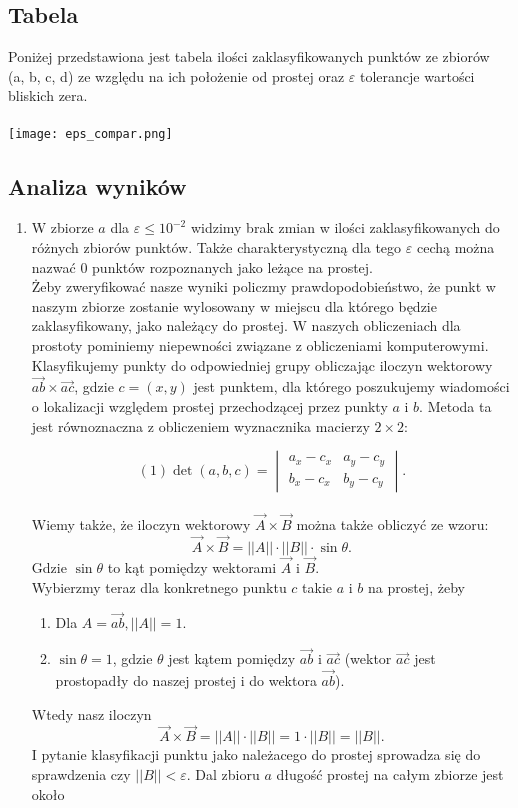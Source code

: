 \subsection{Tabela}
\quad Poniżej przedstawiona jest tabela ilości zaklasyfikowanych punktów
 ze zbiorów \\ (a, b, c, d) ze względu na ich położenie od prostej oraz $\varepsilon$ tolerancje
 wartości bliskich zera.\\ \\
\texttt{[image: eps\_compar.png]}
\subsection{Analiza wyników}
\begin{enumerate}
    \item W zbiorze $a$ dla $\varepsilon \leq 10^{-2}$ widzimy brak zmian 
w ilości zaklasyfikowanych do różnych zbiorów punktów. Także charakterystyczną dla tego $\varepsilon$ 
cechą można nazwać $0$ punktów rozpoznanych jako leżące na prostej.\\
Żeby zweryfikować nasze wyniki policzmy prawdopodobieństwo, że punkt w naszym zbiorze zostanie 
wylosowany w miejscu dla którego będzie zaklasyfikowany, jako należący do prostej. 
W naszych obliczeniach dla prostoty pominiemy niepewności związane z obliczeniami komputerowymi.\\
Klasyfikujemy punkty do odpowiedniej grupy obliczając iloczyn wektorowy
$\overrightarrow{ab} \times \overrightarrow{ac}$, gdzie $ c = (x,y)$ jest punktem, dla którego poszukujemy wiadomości o lokalizacji względem prostej przechodzącej przez punkty $ a$ i $ b$. Metoda ta jest równoznaczna z obliczeniem wyznacznika macierzy $ 2\times2$:  

$$
(1)\det(a, b, c)= \begin{vmatrix}
       a_{x} - c_{x} & a_{y} - c_{y} \\
       b_{x} - c_{x} & b_{y} - c_{y} 
              \end{vmatrix}.
$$\\
Wiemy także, że iloczyn wektorowy $\overrightarrow{A} \times \overrightarrow{B}$ można także obliczyć ze wzoru: 
$$
\overrightarrow{A} \times \overrightarrow{B} = ||A|| \cdot ||B|| \cdot \sin{\theta}.
$$
Gdzie $\sin{\theta}$ to kąt pomiędzy wektorami $\overrightarrow{A}$ i $\overrightarrow{B}$.\\
Wybierzmy teraz dla konkretnego punktu $c$ takie $a$ i $b$ na prostej, żeby 
\begin{enumerate}
    \item Dla $A = \overrightarrow{ab}, ||{A}|| = 1$.
    \item $\sin{\theta} = 1$, gdzie $\theta$ jest kątem pomiędzy $\overrightarrow{ab}$ i $\overrightarrow{ac}$ (wektor $\overrightarrow{ac}$ jest prostopadły do naszej prostej i do wektora $\overrightarrow{ab}$).
\end{enumerate}
Wtedy nasz iloczyn $$\overrightarrow{A} \times \overrightarrow{B} = ||A|| \cdot ||B|| = 1 \cdot ||B|| = ||B||.$$
I pytanie klasyfikacji punktu jako należacego do prostej sprowadza się do sprawdzenia czy $||B|| < \varepsilon$.
Dal zbioru $a$ długość prostej na całym zbiorze jest około 
\end{enumerate}